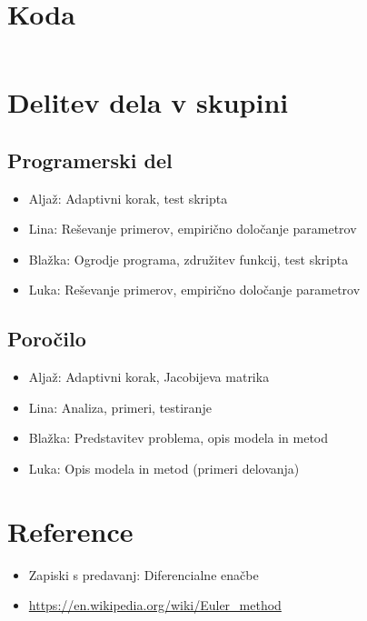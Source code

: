 \documentclass[12pt]{article}
\begin{document}
\newpage
\section{Koda}
\begin{lstlisting}[language=Octave]

\end{lstlisting}
\newpage
\section{Delitev dela v skupini}
\subsection{Programerski del}
\begin{itemize}
	\item Aljaž: Adaptivni korak, test skripta
	\item Lina: Re\v{s}evanje primerov, empiri\v{c}no določanje parametrov
	\item Blažka: Ogrodje programa, zdru\v{z}itev funkcij, test skripta
	\item Luka: Re\v{s}evanje primerov, empiri\v{c}no določanje parametrov
\end{itemize}
\subsection{Poro\v{c}ilo}
\begin{itemize}
	\item Aljaž: Adaptivni korak, Jacobijeva matrika
	\item Lina: Analiza, primeri, testiranje
	\item Blažka: Predstavitev problema, opis modela in metod
	\item Luka: Opis modela in metod (primeri delovanja)
\end{itemize}
\section{Reference}
\begin{itemize}
	\item Zapiski s predavanj: Diferencialne ena\v{c}be
	\item \url{https://en.wikipedia.org/wiki/Euler_method}
\end{itemize}
\end{document}
